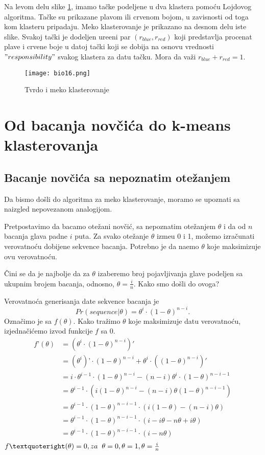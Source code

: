 Na levom delu slike \ref{slika 16}, imamo tačke podeljene u dva klastera pomoću Lojdovog algoritma. Tačke su prikazane plavom ili crvenom bojom, u zavisnosti od toga kom klasteru pripadaju. Meko klasterovanje je prikazano na desnom delu iste slike. Svakoj tački je dodeljen ure\dj eni par $(r_{blue}, r_{red})$ koji predstavlja procenat plave i crvene boje u datoj tački koji se dobija na osnovu vrednosti $"responsibility"$ svakog klastera za datu tačku. Mora da važi $r_{blue} + r_{red} = 1$.
\begin{figure}[h!]
    \centering
    \texttt{[image: bio16.png]}
    \caption{Tvrdo i meko klasterovanje}
    \label{slika 16}
\end{figure}

\section{Od bacanja novčića do k-means klasterovanja}
\subsection{Bacanje novčića sa nepoznatim otežanjem}
Da bismo došli do algoritma za meko klasterovanje, moramo se upoznati sa naizgled nepovezanom analogijom.

Pretpostavimo da bacamo otežani novčić, sa nepoznatim otežanjem $\theta$ i da od $n$ bacanja glava padne $i$ puta. Za svako otežanje $\theta$ izme\dj u 0 i 1, možemo izračunati verovatnoću dobijene sekvence bacanja. Potrebno je da na\dj emo $\theta$ koje maksimizuje ovu verovatnoću.

Čini se da je najbolje da za $\theta$ izaberemo broj pojavljivanja glave podeljen sa ukupnim brojem bacanja, odnosno, $\theta = \frac{i}{n}$. Kako smo došli do ovoga?

Verovatnoća generisanja date sekvence bacanja je 
$$Pr(sequence|{\theta}) = {\theta}^i \cdot (1-{\theta})^{n-i}.$$
Označimo je sa $f(\theta)$. Kako tražimo $\theta$ koje maksimizuje datu verovatnoću, izjednačićemo izvod funkcije $f$ sa 0.
\begin{equation}
\begin{split}
f’(\theta) & = (\theta^i \cdot (1-\theta)^{n-i})'\\
	  & = (\theta^i)’ \cdot (1-\theta)^{n-i} + \theta^i \cdot ((1-\theta)^{n-i})'\\
	  & = i \cdot \theta^{i-1} \cdot (1-\theta)^{n-i} - (n-i)\theta^i \cdot (1-\theta)^{n-i-1}\\
	  & = \theta^{i-1} \cdot (i(1-\theta)^{n-i} - (n-i)\theta(1-\theta)^{n-i-1})\\
	  & = \theta^{i-1} \cdot (1-\theta)^{n-i-1} \cdot (i(1-\theta)-(n-i)\theta)\\
	  & = \theta^{i-1} \cdot (1-\theta)^{n-i-1} \cdot (i-i\theta-n\theta+i\theta)\\
	  & = \theta^{i-1} \cdot (1-\theta)^{n-i-1} \cdot (i-n\theta)\\
\end{split}
\end{equation}
$f’(\theta)=0, za \hspace{0.2cm} \theta=0, \theta=1, \theta=\frac{i}{n}$ 

